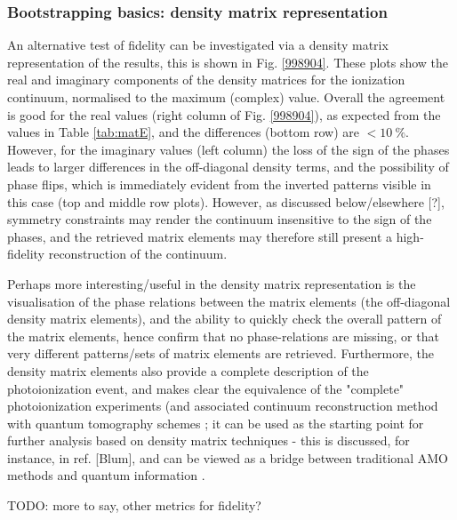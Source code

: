 \subsubsection{Bootstrapping basics: density matrix representation}

An alternative test of fidelity can be investigated via a density matrix representation of the results, this is shown in Fig. \ref{998904}. These plots show the real and imaginary components of the density matrices for the ionization continuum, normalised to the maximum (complex) value. Overall the agreement is good for the real values (right column of Fig. \ref{998904}), as expected from the values in Table \ref{tab:matE}, and the differences (bottom row) are $<10~\%$. However, for the imaginary values (left column) the loss of the sign of the phases leads to larger differences in the off-diagonal density terms, and the possibility of phase flips, which is immediately evident from the inverted patterns visible in this case (top and middle row plots). However, as discussed below/elsewhere [?], symmetry constraints may render the continuum insensitive to the sign of the phases, and the retrieved matrix elements may therefore still present a high-fidelity reconstruction of the continuum.

Perhaps more interesting/useful in the density matrix representation is the visualisation of the phase relations between the matrix elements (the off-diagonal density matrix elements), and the ability to quickly check the overall pattern of the matrix elements, hence confirm that no phase-relations are missing, or that very different patterns/sets of matrix elements are retrieved. Furthermore, the density matrix elements also provide a complete description of the photoionization event, and makes clear the equivalence of the "complete" photoionization experiments (and associated continuum reconstruction method with quantum tomography schemes \cite{MauroDAriano2003}; it can be used as the starting point for further analysis based on density matrix techniques - this is discussed, for instance, in ref. [Blum], and can be viewed as a bridge between traditional AMO methods and quantum information .

TODO: more to say, other metrics for fidelity?
